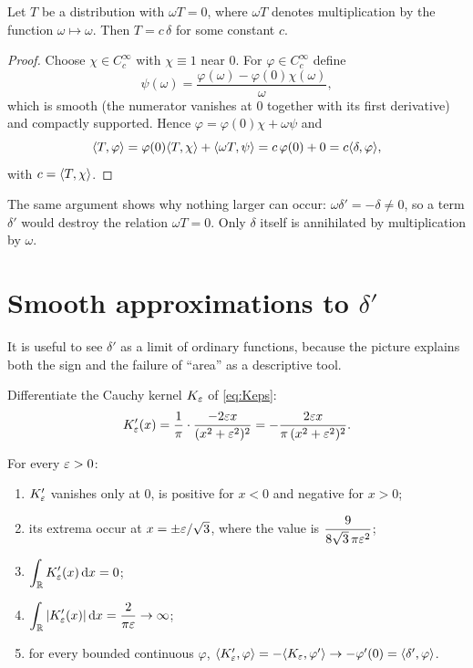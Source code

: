 \begin{proposition}\label{prop:keromega}
Let $T$ be a distribution with $\omega T=0$, where $\omega T$ denotes multiplication by the
function $\omega\mapsto\omega$. Then $T=c\,\delta$ for some constant $c$.
\end{proposition}

\begin{proof}
Choose $\chi\in C_{c}^{\infty}$ with $\chi\equiv1$ near $0$. For $\varphi\in C_{c}^{\infty}$ define
\begin{equation}
\psi(\omega)=\frac{\varphi(\omega)-\varphi(0)\chi(\omega)}{\omega},
\end{equation}
which is smooth (the numerator vanishes at $0$ together with its first derivative) and compactly
supported. Hence $\varphi=\varphi(0)\chi+\omega\psi$ and
\begin{equation}
\langle T,\varphi\rangle=\varphi(0)\langle T,\chi\rangle+\langle \omega T,\psi\rangle
=c\,\varphi(0)+0=c\langle \delta,\varphi\rangle,
\end{equation}
with $c=\langle T,\chi\rangle$.
\end{proof}

\begin{remark}
The same argument shows why nothing larger can occur: $\omega\delta'=-\delta\neq0$, so a term
$\delta'$ would destroy the relation $\omega T=0$. Only $\delta$ itself is annihilated by
multiplication by $\omega$.
\end{remark}

\section{Smooth approximations to \texorpdfstring{$\delta'$}{delta prime}}

It is useful to see $\delta'$ as a limit of ordinary functions, because the picture explains both
the sign and the failure of ``area'' as a descriptive tool.

Differentiate the Cauchy kernel $K_{\varepsilon}$ of \eqref{eq:Keps}:
\begin{equation}
K_{\varepsilon}'(x)=\frac{1}{\pi}\cdot\frac{-2\varepsilon x}{(x^{2}+\varepsilon^{2})^{2}}
=-\frac{2\varepsilon x}{\pi\,(x^{2}+\varepsilon^{2})^{2}} .
\label{eq:Kprime}
\end{equation}

\begin{proposition}\label{prop:Kprime}
For every $\varepsilon>0$:
\begin{enumerate}
\item $K_{\varepsilon}'$ vanishes only at $0$, is positive for $x<0$ and negative for $x>0$;
\item its extrema occur at $x=\pm\varepsilon/\sqrt3$, where the value is
$\dfrac{9}{8\sqrt3\,\pi\varepsilon^{2}}$;
\item $\displaystyle\int_{\mathbb{R}}K_{\varepsilon}'(x)\,\mathrm{d} x=0$;
\item $\displaystyle\int_{\mathbb{R}}|K_{\varepsilon}'(x)|\,\mathrm{d} x=\frac{2}{\pi\varepsilon}\to\infty$;
\item for every bounded continuous $\varphi$,
$\langle K_{\varepsilon}',\varphi\rangle=-\langle K_{\varepsilon},\varphi'\rangle\to-\varphi'(0)=\langle \delta',\varphi\rangle$.
\end{enumerate}
\end{proposition}

